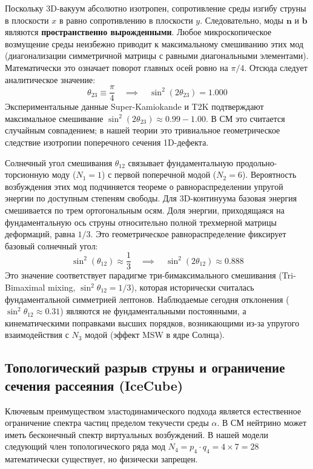 \documentclass[12pt,a4paper]{article}
\begin{document}
	Поскольку 3D-вакуум абсолютно изотропен, сопротивление среды изгибу струны в плоскости $x$ в равно сопротивлению в плоскости $y$. Следовательно, моды $\mathbf{n}$ и $\mathbf{b}$ являются \textbf{пространственно вырожденными}. Любое микроскопическое возмущение среды неизбежно приводит к максимальному смешиванию этих мод (диагонализации симметричной матрицы с равными диагональными элементами). 
	Математически это означает поворот главных осей ровно на $\pi/4$. Отсюда следует аналитическое значение:
	\begin{equation}
		\theta_{23} \equiv \frac{\pi}{4} \quad \implies \quad \sin^2(2\theta_{23}) = \mathbf{1.000}
	\end{equation}
	Экспериментальные данные Super-Kamiokande и T2K подтверждают максимальное смешивание $\sin^2(2\theta_{23}) \approx 0.99 - 1.00$. В СМ это считается случайным совпадением; в нашей теории это тривиальное геометрическое следствие изотропии поперечного сечения 1D-дефекта.
	
	Солнечный угол смешивания $\theta_{12}$ связывает фундаментальную продольно-торсионную моду ($N_1=1$) с первой поперечной модой ($N_2=6$). Вероятность возбуждения этих мод подчиняется теореме о равнораспределении упругой энергии по доступным степеням свободы. 
	Для 3D-континуума базовая энергия смешивается по трем ортогональным осям. Доля энергии, приходящаяся на фундаментальную ось струны относительно полной трехмерной матрицы деформаций, равна $1/3$. Это геометрическое равнораспределение фиксирует базовый солнечный угол:
	\begin{equation}
		\sin^2(\theta_{12}) \approx \frac{1}{3} \quad \implies \quad \sin^2(2\theta_{12}) \approx \mathbf{0.888}
	\end{equation}
	Это значение соответствует парадигме три-бимаксимального смешивания (Tri-Bimaximal mixing, $\sin^2\theta_{12} = 1/3$), которая исторически считалась фундаментальной симметрией лептонов. Наблюдаемые сегодня отклонения ($\sin^2\theta_{12} \approx 0.31$) являются не фундаментальными постоянными, а кинематическими поправками высших порядков, возникающими из-за упругого взаимодействия с $N_3$ модой (эффект MSW в ядре Солнца).
	
	\subsection{Топологический разрыв струны и ограничение сечения рассеяния (IceCube)}
	Ключевым преимуществом эластодинамического подхода является естественное ограничение спектра частиц пределом текучести среды $\alpha$. В СМ нейтрино может иметь бесконечный спектр виртуальных возбуждений. В нашей модели следующий член топологического ряда мод $N_4 = p_4 \cdot q_4 = 4 \times 7 = 28$ математически существует, но физически запрещен.
	
\end{document}
